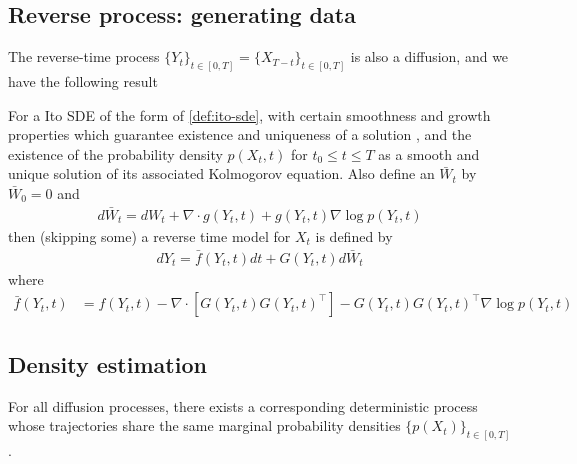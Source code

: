 \subsection{Reverse process: generating data}
The reverse-time process $\{ Y_t \}_{t\in [0,T]} = \{ X_{T-t} \}_{t\in [0,T]}$ is also a diffusion, and we have the following result
\begin{theorem}
For a Ito SDE of the form of \cref{def:ito-sde}, with certain smoothness and growth properties which guarantee existence and uniqueness of a solution  \cite{kushner1974stochastic}, and the existence of the probability density $p(X_t,t)$ for $t_0 \leq t\leq T$ as a smooth and unique solution of its associated Kolmogorov equation. Also define an $\bar{W}_t$ by $\bar{W}_{0} = 0$ and 
\begin{align}
    d\bar{W}_t = dW_t + \nabla \cdot g(Y_t, t) + g(Y_t, t) \nabla \log p(Y_t, t)
\end{align}
then (skipping some) a reverse time model for $X_t$ is defined by 
\begin{align}
    dY_t = \bar{f}(Y_t, t) dt + G(Y_t, t) d\bar{W}_t
\end{align}
where
\begin{align}
    \bar{f}(Y_t, t) &= f(Y_t, t) - \nabla \cdot[G(Y_t, t)G(Y_t, t)^\top] - G(Y_t,t)G(Y_t, t)^\top \nabla \log p(Y_t, t) \label{eqn:rev_time_drift} 
\end{align}
\end{theorem}



\subsection{Density estimation}
%
For all diffusion processes, there exists a corresponding deterministic process whose trajectories share the same marginal probability densities $\{p(X_t)\}_{t\in[0,T]}$.

